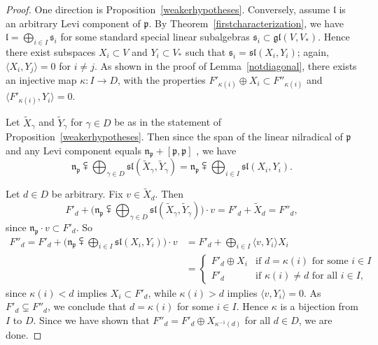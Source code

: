 \documentclass{amsart}
\theoremstyle{definition}
\theoremstyle{remark}
\numberwithin{equation}{section}
\def\gl{\mathfrak {gl}}
\def\l{\mathfrak {l}}
\def\n{\mathfrak {n}}
\def\p{\mathfrak {p}}
\def\sl{\mathfrak{sl}}
\def\s{\mathfrak{s}}
\begin{document}
\begin{proof}
One direction is Proposition~\ref{weakerhypotheses}.  Conversely, assume $\l$ is an arbitrary Levi component of $\p$.  By Theorem~\ref{firstcharacterization}, we have $\l = \bigoplus_{i \in I} \s_i$ for some standard special linear subalgebras $\s_i \subset \gl(V,V_*)$.  Hence there exist subspaces $X_i \subset V$ and $Y_i \subset V_*$ such that $\s_i = \sl(X_i, Y_i)$; again, $\langle X_i , Y_j \rangle = 0$ for $i \neq j$.
As shown in the proof of Lemma~\ref{notdiagonal}, there exists an injective map $\kappa : I \rightarrow D$, with the properties $F'_{\kappa(i)} \oplus X_i \subset F''_{\kappa(i)}$ and $\langle F'_{\kappa(i)} , Y_i \rangle = 0$. 

Let  $\tilde{X}_\gamma$ and $\tilde{Y}_\gamma$ for $\gamma \in D$ be as in the statement of Proposition~\ref{weakerhypotheses}.  Then since the span of the linear nilradical of $\p$ and any Levi component equals $\n_\p + [\p,\p]$ \cite{DP}, we have
$$\n_\p \subsetplus \bigoplus_{\gamma \in D} \sl(\tilde{X}_\gamma , \tilde{Y}_\gamma) = \n_\p \subsetplus \bigoplus_{i \in I} \sl(X_i, Y_i).$$

Let $d \in D$ be arbitrary.  Fix $v \in  \tilde{X}_d$.  Then
$$F'_d  + \big( \n_\p \subsetplus \bigoplus_{\gamma \in D} \sl(\tilde{X}_\gamma , \tilde{Y}_\gamma) \big) \cdot v  =  F'_d + \tilde{X}_d = F''_d,$$
since $\n_\p \cdot v \subset F'_d$.  So
\begin{align*}
F''_d  = F'_d + \big( \n_\p \subsetplus  \bigoplus_{i \in I} \sl(X_i, Y_i) \big) \cdot v 
& = F'_d + \bigoplus_{i \in I} \langle v , Y_i \rangle X_i \\
& = \begin{cases}
F'_d \oplus X_i & \textrm{if } d = \kappa (i) \textrm{ for some } i \in I\\
F'_d &  \textrm{if } \kappa (i) \neq d \textrm{ for all } i \in I,
\end{cases}
\end{align*}
since $\kappa (i) < d$ implies $X_i \subset F'_d$, while $\kappa (i) > d$ implies $\langle v , Y_i \rangle = 0$.  As $F'_d \subsetneq F''_d$, we conclude that $d = \kappa (i)$ for some $i \in I$.  Hence $\kappa$ is a bijection from $I$ to $D$.  Since we have shown that $F''_d = F'_d \oplus X_{\kappa^{-1} (d)}$ for all $d \in D$, we are done.
\end{proof}
 
\end{document}
